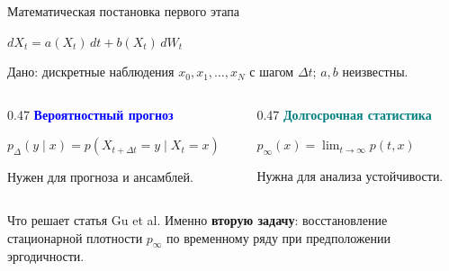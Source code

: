 \documentclass[10pt,aspectratio=169]{beamer}
\begin{document}
\begin{frame}{Математическая постановка первого этапа}
\vspace{0.13cm}
\begin{center}
{\Large $dX_t=a(X_t)\,dt+b(X_t)\,dW_t$}
\end{center}
\vspace{0.16cm}
Дано: дискретные наблюдения $x_0,x_1,\dots,x_N$ с шагом $\Delta t$; $a,b$ неизвестны.
\vspace{0.2cm}
\begin{columns}[T,onlytextwidth]
\begin{column}{0.47\textwidth}
\textcolor{blue}{\bfseries Вероятностный прогноз}\par\vspace{0.17cm}
$\displaystyle p_\Delta(y\mid x)=p(X_{t+\Delta t}=y\mid X_t=x)$\par\vspace{0.17cm}
Нужен для прогноза и ансамблей.
\end{column}
\begin{column}{0.47\textwidth}
\textcolor{teal}{\bfseries Долгосрочная статистика}\par\vspace{0.17cm}
$\displaystyle p_\infty(x)=\lim_{t\to\infty}p(t,x)$\par\vspace{0.17cm}
Нужна для анализа устойчивости.
\end{column}
\end{columns}
\vspace{0.28cm}
\begin{block}{Что решает статья Gu et al.}
Именно \textbf{вторую задачу}: восстановление стационарной плотности $p_\infty$ по временному ряду при предположении эргодичности.
\end{block}
\end{frame}
\end{document}
